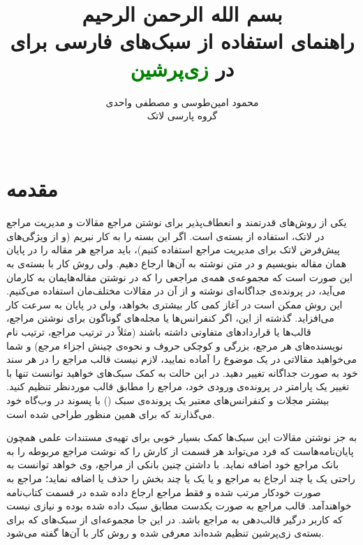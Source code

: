\documentclass{article}
\title{\vspace{-2cm}
{\small بسم الله الرحمن الرحيم\\}
\vspace{2cm}
 راهنمای استفاده از سبک‌های فارسی  برای \textcolor{red}{\lr{\textsc{Bib}\TeX}}\\
 در \textcolor{green}{زی‌پرشین}\\
\lr{(Persian-bib User Guide)}
}
\author{محمود امین‌طوسی و مصطفی واحدی\\
گروه پارسی لاتک\\
\lr{http://www.parsilatex.com}\\
\lr{\{m.amintoosi,mostafa.vahedi\} at gmail.com}
}
\theoremstyle{plain}\newtheorem{question}{پرسش}
\begin{document}
\maketitle
\vspace{2cm}
\tableofcontents

\section{مقدمه}

یکی از روش‌های قدرتمند و انعطاف‌پذیر برای نوشتن مراجع مقالات و مدیریت مراجع در لاتک، استفاده از بسته‌ی  است.
اگر این بسته را به کار نبریم (و از ویژگی‌های پیش‌فرض لاتک برای مدیریت مراجع استفاده کنیم)، باید مراجع هر مقاله را در پایان همان مقاله بنویسیم
و در متن نوشته به آن‌ها ارجاع دهیم. ولی روش کار با بسته‌ی  به این صورت است که مجموعه‌ی همه‌ی مراجعی را که در نوشتن مقاله‌هایمان به کارمان می‌آید، 
در پرونده‌ی جداگانه‌ای نوشته و از آن در مقالات مختلف‌مان استفاده می‌کنیم.  این روش ممکن است در آغاز کمی کار بیشتری بخواهد، ولی در پایان به سرعت کار می‌افزاید.
گذشته از این، اگر  کنفرانس‌ها یا مجله‌های گوناگون برای نوشتن مراجع، قالب‌ها یا قراردادهای متفاوتی داشته باشند
 (مثلاً در ترتیب مراجع، ترتیب نام نویسنده‌های هر مرجع، بزرگی و کوچکی حروف و نحوه‌ی چینش اجزاء مرجع) و شما می‌خواهید مقالاتی در یک موضوع را آماده نمایید،
 لازم نیست قالب مراجع را در هر سند خود به صورت جداگانه تغییر دهید. 
 در این حالت به کمک سبک‌های  خواهید توانست تنها با تغییر یک پارامتر در پرونده‌ی ورودی خود، مراجع را مطابق قالب موردنظر تنظیم کنید. 
 بیشتر مجلات و کنفرانس‌های معتبر یک پرونده‌ی سبک () با پسوند  در وب‌گاه خود می‌گذارند که برای همین منظور طراحی شده است.

به جز نوشتن مقالات این سبک‌ها کمک بسیار خوبی برای تهیه‌ی مستندات علمی همچون پایان‌نامه‌هاست که فرد می‌تواند هر قسمت از کارش را که نوشت مراجع مربوطه
را به بانک مراجع خود اضافه نماید. با داشتن چنین بانکی از مراجع، وی خواهد توانست به راحتی یک یا چند ارجاع به مراجع و یا یک یا چند بخش را حذف یا اضافه ‌نماید؛ 
مراجع به صورت خودکار مرتب شده و فقط مراجع ارجاع داده شده در قسمت کتاب‌نامه خواهندآمد. قالب مراجع به صورت یکدست مطابق سبک داده شده بوده و نیازی نیست
که کاربر درگیر قالب‌دهی به مراجع باشد. 
در این جا مجموعه‌ای از سبک‌های  که برای بسته‌ی زی‌پرشین تنظیم شده‌اند معرفی شده و روش کار با آن‌ها گفته می‌شود.
\end{document}
